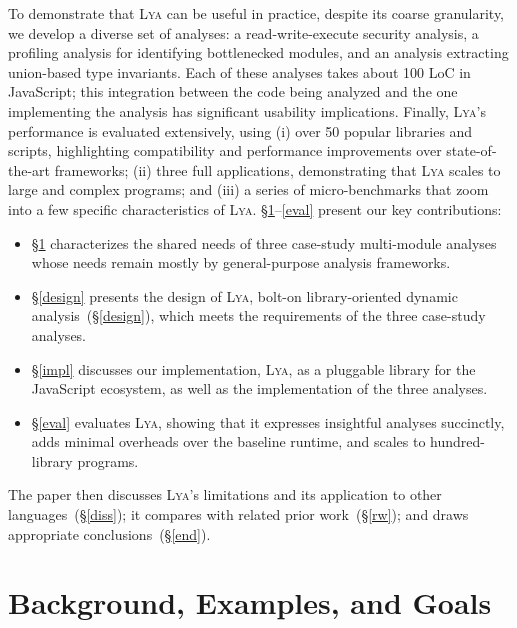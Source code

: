 \documentclass[letterpaper,twocolumn,10pt]{article}
\newcommand{\heading}[1]{\vspace{2pt}\noindent\textbf{#1}\enspace}
\newcommand{\sx}[1]{(\S\ref{#1})}
\newcommand{\sys}{{\scshape Lya}\xspace}
\begin{document}
% 
% 

To demonstrate that \sys can be useful in practice, despite its coarse granularity, we develop a diverse set of analyses:
  a read-write-execute security analysis,
  a profiling analysis for identifying bottlenecked modules,
  and an analysis extracting union-based type invariants.
Each of these analyses takes about 100 LoC in JavaScript;
  this integration between the code being analyzed and the one implementing the analysis has significant usability implications.
Finally, \sys's performance is evaluated extensively, using
  (i) over 50 popular libraries and scripts, highlighting compatibility and performance improvements over state-of-the-art frameworks;
  (ii) three full applications, demonstrating that \sys scales to large and complex programs; and
  (iii) a series of micro-benchmarks that zoom into a few specific characteristics of \sys.
\S\ref{bg}--\ref{eval} present our key contributions:
\begin{itemize}
\item \S\ref{bg} characterizes the shared needs of three case-study multi-module analyses whose needs remain mostly by general-purpose analysis frameworks.
\item \S\ref{design} presents the design of \sys, bolt-on library-oriented dynamic analysis~\sx{design}, which meets the requirements of the three case-study analyses.
\item \S\ref{impl} discusses our implementation, \sys, as a pluggable library for the JavaScript ecosystem, as well as the implementation of the three analyses.
\item \S\ref{eval} evaluates \sys, showing that it expresses insightful analyses succinctly, adds minimal overheads over the baseline runtime, and scales to hundred-library programs.
\end{itemize}
\noindent
The paper then discusses \sys's limitations and its application to other languages~\sx{diss};
  it compares with related prior work~\sx{rw};
  and draws appropriate conclusions~\sx{end}.

\section{Background, Examples, and Goals}
\label{bg}
\end{document}
